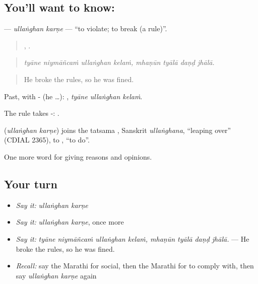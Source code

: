 \subsection*{You'll want to know:  }
\textbf{ } — \emph{ullaṅghan karṇe} — \textquotedblleft{}to violate; to break (a rule)\textquotedblright{}.

\begin{quote}
   ,    .
\end{quote}

\begin{quote}
\emph{tyāne niymāñcaṁ ullaṅghan kelaṁ, mhaṇūn tyālā daṇḍ jhālā.}
\end{quote}

\begin{quote}
He broke the rules, so he was fined.
\end{quote}

Past, with - (he …):   , \emph{tyāne ullaṅghan kelaṁ}.

The rule takes -:  .

\begin{cousinweb}
\textbf{ } (\emph{ullaṅghan karṇe}) joins the tatsama , Sanskrit \emph{ullaṅghana}, \textquotedblleft{}leaping over\textquotedblright{} (CDIAL 2365), to , \textquotedblleft{}to do\textquotedblright{}.
\end{cousinweb}

\begin{grammarlens}[title={What you've built}]
One more word for giving reasons and opinions.
\end{grammarlens}

\subsection*{Your turn}
\begin{itemize}
\raggedright
  \item \emph{Say it:} \emph{ullaṅghan karṇe}
  \item \emph{Say it:} \emph{ullaṅghan karṇe}, once more
  \item \emph{Say it:} \emph{tyāne niymāñcaṁ ullaṅghan kelaṁ, mhaṇūn tyālā daṇḍ jhālā.} — He broke the rules, so he was fined.
  \item \emph{Recall:} say the Marathi for social, then the Marathi for to comply with, then say \emph{ullaṅghan karṇe} again
\end{itemize}

